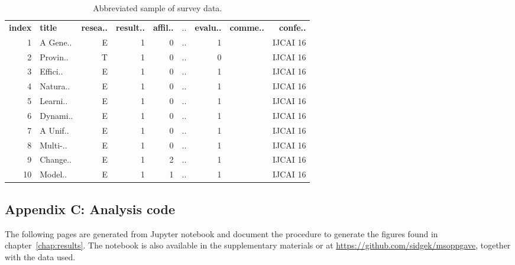 \begin{table}[!h]
\begin{center}
    \begin{tabular}{ rlrrrrrrr }
    \textbf{index} & \textbf{title} & \textbf{resea..} & \textbf{result..} & \textbf{affil..} & .. & \textbf{evalu..} & \textbf{comme..} & \textbf{confe..} \\
    1 & A Gene.. & E & 1 & 0 & ..	& 1 & & IJCAI 16 \\
    2 & Provin.. & T &	1 &	0 & .. & 0 & & IJCAI 16 \\
    3 &	Effici.. &	E &	1 &	0 & .. & 1 & & IJCAI 16 \\
    4 &	Natura.. & E &	1 &	0 &	.. & 1 & & IJCAI 16 \\
    5 &	Learni.. & E &	1 &	0 & .. & 1 & & IJCAI 16 \\
    6 &	Dynami.. & E &	1 &	0 & .. & 1 & & IJCAI 16 \\
    7 &	A Unif.. & E &	1 &	0 &	.. & 1 & & IJCAI 16 \\
    8 &	Multi-.. & E &	1 &	0 & .. & 1 & & IJCAI 16 \\
    9 &	Change.. & E &	1 &	2 & .. & 1 & & IJCAI 16 \\
    10 & Model.. & E & 1 & 1 & .. & 1 & & IJCAI 16 \\
    \end{tabular}
\end{center}
\caption{Abbreviated sample of survey data.}
\label{tab:sample_survey_data}
\end{table}

\subsection*{Appendix C: Analysis code}
\label{app:analysis_code}
The following pages are generated from Jupyter notebook and document the procedure to generate the figures found in chapter~\ref{chap:results}. The notebook is also available in the supplementary materials or at \url{https://github.com/sidgek/msoppgave}, together with the data used.

